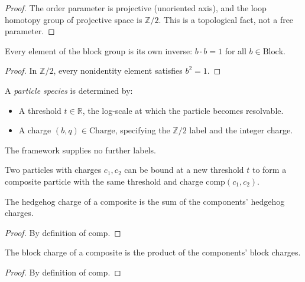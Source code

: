 \begin{proof}
The order parameter is projective (unoriented axis), and the loop homotopy group of projective space is $\mathbb{Z}/2$. This is a topological fact, not a free parameter.
\end{proof}

\begin{theorem}
Every element of the block group is its own inverse: $b \cdot b = 1$ for all $b \in \mathrm{Block}$.
\end{theorem}

\begin{proof}
In $\mathbb{Z}/2$, every nonidentity element satisfies $b^2 = 1$.
\end{proof}

\begin{definition}
A \emph{particle species} is determined by:
\begin{itemize}
\item A threshold $t \in \mathbb{R}$, the log-scale at which the particle becomes resolvable.
\item A charge $(b, q) \in \mathrm{Charge}$, specifying the $\mathbb{Z}/2$ label and the integer charge.
\end{itemize}
The framework supplies no further labels.
\end{definition}

\begin{definition}
Two particles with charges $c_1, c_2$ can be bound at a new threshold $t$ to form a composite particle with the same threshold and charge $\mathrm{comp}(c_1, c_2)$.
\end{definition}

\begin{theorem}
The hedgehog charge of a composite is the sum of the components' hedgehog charges.
\end{theorem}

\begin{proof}
By definition of $\mathrm{comp}$.
\end{proof}

\begin{theorem}
The block charge of a composite is the product of the components' block charges.
\end{theorem}

\begin{proof}
By definition of $\mathrm{comp}$.
\end{proof}

